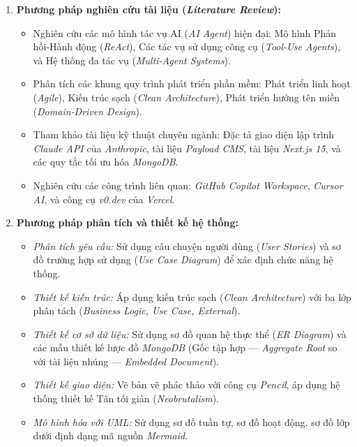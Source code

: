 \documentclass[13pt,a4paper,oneside]{extreport}
\numberwithin{equation}{chapter}
\numberwithin{figure}{chapter}
\numberwithin{table}{chapter}
\begin{document}
\begin{enumerate}
    \item \textbf{Phương pháp nghiên cứu tài liệu (\textit{Literature Review}):}
    \begin{itemize}
        \item Nghiên cứu các mô hình tác vụ AI (\textit{AI Agent}) hiện đại: Mô hình Phản hồi-Hành động (\textit{ReAct}), Các tác vụ sử dụng công cụ (\textit{Tool-Use Agents}), và Hệ thống đa tác vụ (\textit{Multi-Agent Systems}).
        \item Phân tích các khung quy trình phát triển phần mềm: Phát triển linh hoạt (\textit{Agile}), Kiến trúc sạch (\textit{Clean Architecture}), Phát triển hướng tên miền (\textit{Domain-Driven Design}).
        \item Tham khảo tài liệu kỹ thuật chuyên ngành: Đặc tả giao diện lập trình \textit{Claude API} của \textit{Anthropic}, tài liệu \textit{Payload CMS}, tài liệu \textit{Next.js 15}, và các quy tắc tối ưu hóa \textit{MongoDB}.
        \item Nghiên cứu các công trình liên quan: \textit{GitHub Copilot Workspace}, \textit{Cursor AI}, và công cụ \textit{v0.dev} của \textit{Vercel}.
    \end{itemize}

    \item \textbf{Phương pháp phân tích và thiết kế hệ thống:}
    \begin{itemize}
        \item \textit{Phân tích yêu cầu:} Sử dụng câu chuyện người dùng (\textit{User Stories}) và sơ đồ trường hợp sử dụng (\textit{Use Case Diagram}) để xác định chức năng hệ thống.
        \item \textit{Thiết kế kiến trúc:} Áp dụng kiến trúc sạch (\textit{Clean Architecture}) với ba lớp phân tách (\textit{Business Logic, Use Case, External}).
        \item \textit{Thiết kế cơ sở dữ liệu:} Sử dụng sơ đồ quan hệ thực thể (\textit{ER Diagram}) và các mẫu thiết kế lược đồ \textit{MongoDB} (Gốc tập hợp — \textit{Aggregate Root} so với tài liệu nhúng — \textit{Embedded Document}).
        \item \textit{Thiết kế giao diện:} Vẽ bản vẽ phác thảo với công cụ \textit{Pencil}, áp dụng hệ thống thiết kế Tân tối giản (\textit{Neobrutalism}).
        \item \textit{Mô hình hóa với UML:} Sử dụng sơ đồ tuần tự, sơ đồ hoạt động, sơ đồ lớp dưới định dạng mã nguồn \textit{Mermaid}.
    \end{itemize}


\end{enumerate}
\end{document}
